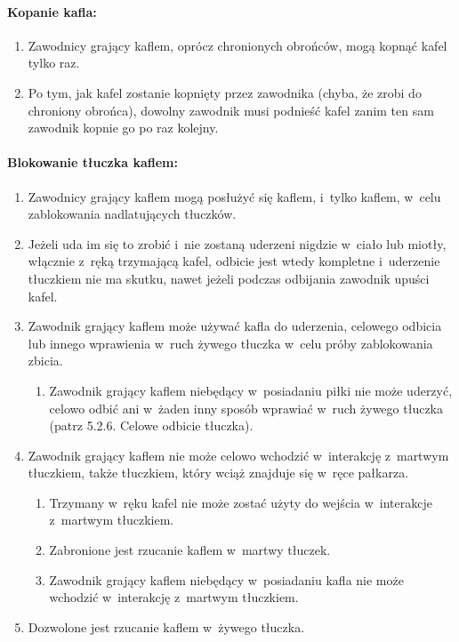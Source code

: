\documentclass[12pt,a4paper]{article}
\begin{document}
\paragraph{Kopanie kafla:}

\begin{enumerate}
	\item
	      Zawodnicy grający kaflem, oprócz chronionych obrońców, mogą kopnąć
	      kafel tylko raz.
	\item
	      Po tym, jak kafel zostanie kopnięty przez zawodnika (chyba, że zrobi do chroniony
	      obrońca), dowolny zawodnik musi podnieść kafel zanim ten sam zawodnik kopnie go po raz kolejny.
\end{enumerate}

\paragraph{Blokowanie tłuczka kaflem: }

\begin{enumerate}
	\item
	      Zawodnicy grający kaflem mogą posłużyć się kaflem, i~tylko kaflem, w~celu zablokowania nadlatujących tłuczków.
	\item
	      Jeżeli uda im się to zrobić i~nie zostaną uderzeni nigdzie w~ciało lub
	      miotły, włącznie z~ręką trzymającą kafel, odbicie jest wtedy kompletne
	      i~uderzenie tłuczkiem nie ma skutku, nawet jeżeli podczas odbijania
	      zawodnik upuści kafel.
	\item
	      Zawodnik grający kaflem może używać kafla do uderzenia, celowego
	      odbicia lub innego wprawienia w~ruch żywego tłuczka w~celu próby
	      zablokowania zbicia.

	      \begin{enumerate}
		      \item
		            Zawodnik grający kaflem niebędący w~posiadaniu piłki nie może
		            uderzyć, celowo odbić ani w~żaden inny sposób wprawiać w~ruch żywego
		            tłuczka (patrz 5.2.6. Celowe odbicie tłuczka).
	      \end{enumerate}
	\item
	      Zawodnik grający kaflem nie może celowo wchodzić w~interakcję z~martwym tłuczkiem, także tłuczkiem, który wciąż znajduje się w~ręce
	      pałkarza.

	      \begin{enumerate}
		      \item
		            Trzymany w~ręku kafel nie może zostać użyty do wejścia w~interakcje
		            z~martwym tłuczkiem.
		      \item
		            Zabronione jest rzucanie kaflem w~martwy tłuczek.
		      \item
		            Zawodnik grający kaflem niebędący w~posiadaniu kafla nie może
		            wchodzić w~interakcję z~martwym tłuczkiem.
	      \end{enumerate}
	\item
	      Dozwolone jest rzucanie kaflem w~żywego tłuczka.
\end{enumerate}
\end{document}
